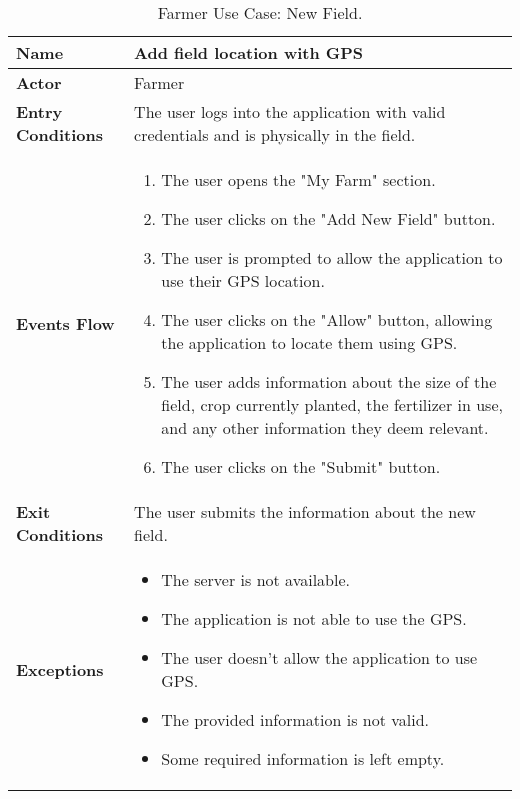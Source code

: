 \begin{table}[hbt!]
\centering
\small
\caption{\label{tab:farmerNewField}Farmer Use Case: New Field.}
\renewcommand{\arraystretch}{1.25}
\begin{tabular}{|l|>{\raggedright\arraybackslash}m{12cm}|}

    \hline
    \textbf{Name} & Add field location with GPS\\
    \hline
   	\textbf{Actor} & Farmer\\
    \hline
    \textbf{Entry Conditions} & The user logs into the application with valid credentials and is physically in the field.\\
    \hline
    \textbf{Events Flow} & 
    		\begin{enumerate}
    			\item The user opens the "My Farm" section.
    			\item The user clicks on the "Add New Field" button.
    			\item The user is prompted to allow the application to use their GPS location.
    			\item The user clicks on the "Allow" button, allowing the application to locate them using GPS.
    			\item The user adds information about the size of the field, crop currently planted, the fertilizer in use, and any other information they deem relevant.
    			\item The user clicks on the "Submit" button.
    		\end{enumerate}
    	\\
    \hline
    \textbf{Exit Conditions} & The user submits the information about the new field.\\
    \hline
    \textbf{Exceptions} & 
    		\begin{itemize}
    			\item The server is not available.
    			\item The application is not able to use the GPS.
    			\item The user doesn't allow the application to use GPS.
    			\item The provided information is not valid.
    			\item Some required information is left empty.
    		\end{itemize}
    \\
    \hline
\end{tabular}
\end{table}